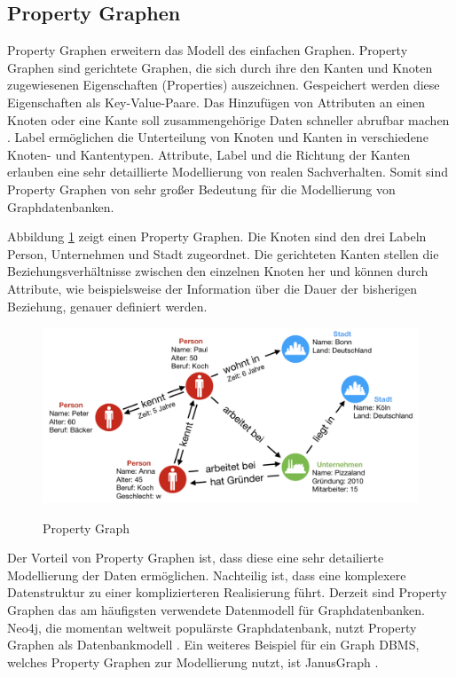 \subsection{Property Graphen}
Property Graphen erweitern das Modell des einfachen Graphen.
Property Graphen sind gerichtete Graphen, die sich durch ihre den Kanten und Knoten zugewiesenen Eigenschaften (Properties) auszeichnen.
Gespeichert werden diese Eigenschaften als Key-Value-Paare.
Das Hinzufügen von Attributen an einen Knoten oder eine Kante soll zusammengehörige Daten schneller abrufbar machen \cite{angles2012comparison}.
Label ermöglichen die Unterteilung von Knoten und Kanten in verschiedene Knoten- und Kantentypen.
Attribute, Label und die Richtung der Kanten erlauben eine sehr detaillierte Modellierung von realen Sachverhalten.
Somit sind Property Graphen von sehr großer Bedeutung für die Modellierung von Graphdatenbanken.

Abbildung \ref{2.property.image} zeigt einen Property Graphen.
Die Knoten sind den drei Labeln Person, Unternehmen und Stadt zugeordnet.
Die gerichteten Kanten stellen die Beziehungsverhältnisse zwischen den einzelnen Knoten her und können durch Attribute, wie beispielsweise der Information über die Dauer der bisherigen Beziehung, genauer definiert werden.
\begin{figure}[H]
\begin{center}
	\includegraphics[scale = 0.65]{./images/Property_graph.png}
	\label{2.property.image}
	\caption{Property Graph}
\end{center}
\end{figure}


Der Vorteil von Property Graphen ist, dass diese eine sehr detailierte Modellierung der Daten ermöglichen.
Nachteilig ist, dass eine komplexere Datenstruktur zu einer komplizierteren Realisierung führt.
Derzeit sind Property Graphen das am häufigsten verwendete Datenmodell für Graphdatenbanken.
Neo4j, die momentan weltweit populärste Graphdatenbank, nutzt Property Graphen als Datenbankmodell \cite{neo4j}.
Ein weiteres Beispiel für ein Graph \ac{DBMS}, welches Property Graphen zur Modellierung nutzt, ist JanusGraph \cite{janus}.

